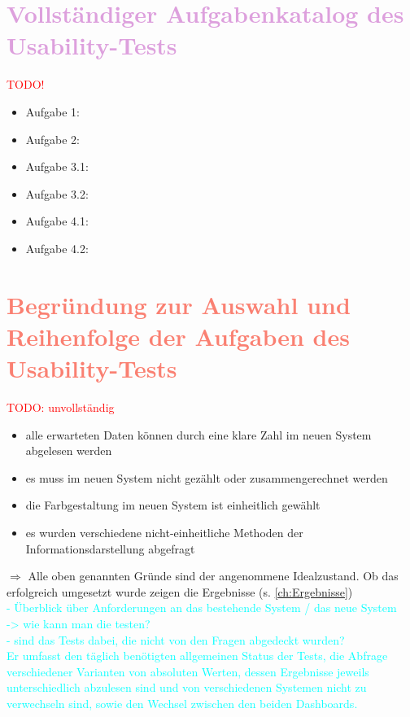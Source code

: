 \section{\textcolor{Plum}{Vollständiger Aufgabenkatalog des Usability-Tests}}
\label{Add:Usability_Test:Aufgabenkatalog}

\textcolor{red}{TODO!}
\begin{itemize}
    \item Aufgabe 1: 
    \item Aufgabe 2: 
    \item Aufgabe 3.1: 
    \item Aufgabe 3.2: 
    \item Aufgabe 4.1: 
    \item Aufgabe 4.2: 
\end{itemize}

\section{\textcolor{Salmon}{Begründung zur Auswahl und Reihenfolge der Aufgaben des Usability-Tests}}
\label{Add:Usability_Test:Begündung_Filterung}
\textcolor{red}{TODO: unvollständig}\\

\begin{itemize}
    \item alle erwarteten Daten können durch eine klare Zahl im neuen System abgelesen werden
    \item es muss im neuen System nicht gezählt oder zusammengerechnet werden
    \item die Farbgestaltung im neuen System ist einheitlich gewählt
    \item es wurden verschiedene nicht-einheitliche Methoden der Informationsdarstellung abgefragt
\end{itemize}

\noindent
$\Rightarrow$ Alle oben genannten Gründe sind der angenommene Idealzustand. Ob das erfolgreich umgesetzt wurde zeigen die Ergebnisse (s. \autoref{ch:Ergebnisse})\\

\textcolor{cyan}{
- Überblick über Anforderungen an das bestehende System / das neue System\\
-> wie kann man die testen?\\
- sind das Tests dabei, die nicht von den Fragen abgedeckt wurden?\\
Er umfasst den täglich benötigten allgemeinen Status der Tests, die Abfrage verschiedener Varianten von absoluten Werten, dessen Ergebnisse jeweils unterschiedlich abzulesen sind und von verschiedenen Systemen nicht zu verwechseln sind, sowie den Wechsel zwischen den beiden Dashboards. 
}

